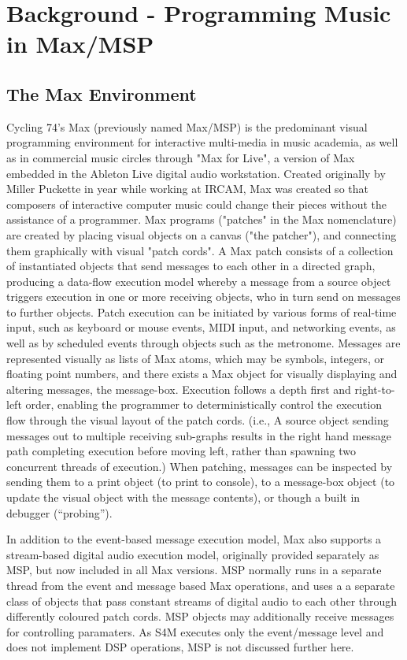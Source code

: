 \documentclass[acmsmall]{acmart}
\begin{document}
\section{Background - Programming Music in Max/MSP}

\subsection{The Max Environment}
Cycling 74’s Max (previously named Max/MSP) is the predominant visual programming environment 
for interactive multi-media in music academia, as well as in commercial music circles through "Max
for Live", a version of Max embedded in the Ableton Live digital audio workstation. Created 
originally by Miller Puckette in {year} while working at IRCAM, Max was created so that composers
of interactive computer music could change their pieces without the assistance of a programmer. Max 
programs ("patches" in the Max nomenclature) are created by placing visual objects on a canvas ("the 
patcher"), and connecting them graphically with visual "patch cords". A Max patch consists of a 
collection of instantiated objects that send messages to each other in a directed graph, producing a 
data-flow execution model whereby a message from a source object triggers execution in one or more 
receiving objects, who in turn send on messages to further objects. Patch execution can be initiated by 
various forms of real-time input, such as keyboard or mouse events, MIDI input, and networking 
events, as well as by scheduled events through objects such as the metronome. Messages are 
represented visually as lists of Max atoms, which may be symbols, integers, or floating point numbers, 
and there exists a Max object for visually displaying and altering messages, the message-box.  
Execution follows a depth first and right-to-left order, enabling the programmer to deterministically 
control the execution flow through the visual layout of the patch cords.  (i.e., A source object sending 
messages out to multiple receiving sub-graphs results in the right hand message path completing 
execution before moving left, rather than spawning two concurrent threads of execution.)  When 
patching, messages can be inspected by sending them to a print object (to print to console), to a 
message-box object (to update the visual object with the message contents), or though a built in 
debugger (“probing”).

In addition to the event-based message execution model, Max also supports a stream-based digital 
audio execution model, originally provided separately as MSP, but now included in all Max versions. 
MSP normally runs in a separate thread from the event and message based Max operations, and uses a  
a separate class of objects that pass constant streams of digital audio to each other through differently 
coloured patch cords. MSP objects may additionally receive messages for controlling paramaters. As  
S4M executes only the event/message level and does not implement DSP operations, MSP is not 
discussed further here. 
\end{document}
